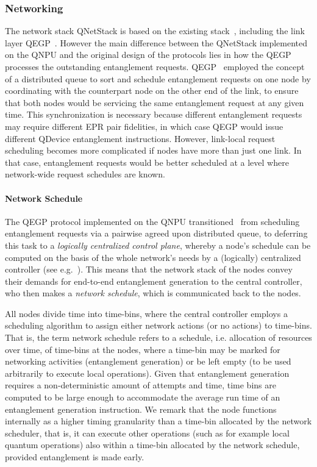 \subsubsection{Networking}
\label{qnodeos:sec:arch-networking}

The network stack \ac{QNetStack} is based on the existing stack~\cite{dahlberg_2019_egp}, including the link layer \ac{QEGP}~\cite{dahlberg_2019_egp}.
However the main difference between the \ac{QNetStack} implemented on the \ac{QNPU} and the original design of the protocols lies in how the \ac{QEGP} processes the outstanding entanglement requests. \ac{QEGP}~\cite{dahlberg_2019_egp} employed the concept of a distributed queue to sort and schedule entanglement requests on one node by coordinating with the counterpart node on the other end of the link, to ensure that both nodes would be servicing the same entanglement request at any given time. This synchronization is necessary because different entanglement requests may require different \ac{EPR} pair fidelities, in which case \ac{QEGP} would issue different \ac{QDevice} entanglement instructions. However, link-local request scheduling becomes more complicated if nodes have more than just one link. In that case, entanglement requests would be better scheduled at a level where network-wide request schedules are known. 

\paragraph{Network Schedule}
The \ac{QEGP} protocol implemented on the \ac{QNPU} transitioned~\cite{pompili_2022_experimental} from scheduling entanglement requests via a pairwise agreed upon distributed queue, to deferring this task to a \emph{logically centralized control plane}, whereby a node's schedule can be computed on the basis of the whole network's needs by a (logically) centralized controller (see e.g.~\cite{skrzypczyk_2021_arch}). This means that the network stack of the nodes convey their demands for end-to-end entanglement generation to the central controller, who then makes a \emph{network schedule}, which is communicated back to the nodes. 

All nodes divide time into time-bins, where the central controller employs a scheduling algorithm to assign either network actions (or no actions) to time-bins. That is, the term network schedule refers to a schedule, i.e. allocation of resources over time, of time-bins at the nodes, where a time-bin may be marked for networking activities (entanglement generation) or be left empty (to be used arbitrarily to execute local operations). 
Given that entanglement generation requires a non-deterministic amount of attempts and time, time bins are computed to be large enough to accommodate the average run time of an entanglement generation instruction. 
We remark that the node functions internally as a higher timing granularity than a time-bin allocated by the network scheduler, that is, it can execute other operations (such as for example local quantum operations) also within a time-bin allocated by the network schedule, provided entanglement is made early.

